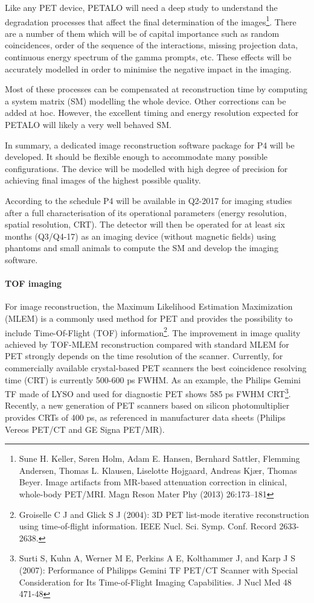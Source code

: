 Like any PET device, PETALO will need a deep study to understand the  
degradation processes that affect the final determination of the images\footnote{Sune H. Keller,  Søren Holm, Adam E. Hansen, Bernhard Sattler, Flemming Andersen, Thomas L. Klausen, Liselotte Hojgaard,  Andreas Kjær, Thomas Beyer. Image artifacts from MR-based attenuation correction in clinical, whole-body PET/MRI. Magn Reson Mater Phy (2013) 26:173–181}. There are a number of them which will be of capital importance such as random coincidences, order of the sequence of the interactions, missing projection data, continuous energy spectrum of the gamma prompts, etc. These effects will be accurately modelled in order to minimise the negative impact in the imaging.

Most of these processes can be compensated at reconstruction time by computing a system matrix (SM) modelling the whole device. Other corrections can be added at hoc. However, the excellent timing and energy resolution expected for PETALO will likely a very well behaved SM. 

In summary, a dedicated image reconstruction software package for P4 will be developed. It should be flexible enough to accommodate many possible configurations. The device will be modelled with high degree of precision for achieving final images of the highest possible quality. 

According to the schedule P4 will be available in Q2-2017 for imaging studies after a full characterisation of its operational parameters (energy resolution, spatial resolution, CRT). The detector will then be operated for at least six months (Q3/Q4-17) as an imaging device (without magnetic fields) using phantoms and small animals to compute the SM and develop the imaging software.  

\paragraph{TOF imaging}

For image reconstruction, the Maximum Likelihood Estimation Maximization
(MLEM) is a commonly used method for PET and provides the possibility to include
Time-Of-Flight (TOF) information\footnote{Groiselle C J and Glick S J (2004): 3D PET list-mode iterative reconstruction using time-of-flight
information. IEEE Nucl. Sci. Symp. Conf. Record 2633-2638.}. The improvement in image quality achieved by TOF-MLEM reconstruction compared with standard MLEM for PET strongly depends
on the time resolution of the scanner. Currently, for commercially available crystal-based PET scanners the best coincidence resolving time (CRT) is currently   500-600 ps FWHM. As an example, the Philips Gemini TF made of LYSO and used for diagnostic PET shows 585 ps FWHM CRT\footnote{Surti S, Kuhn A, Werner M E, Perkins A E, Kolthammer J, and Karp J S (2007): Performance of
Philipps Gemini TF PET/CT Scanner with Special Consideration for Its Time-of-Flight Imaging
Capabilities. J Nucl Med 48 471-48}.
Recently, a new generation of PET scanners based on silicon photomultiplier provides
CRTs of 400 ps, as referenced in manufacturer data sheets (Philips Vereos PET/CT and
GE Signa PET/MR).

